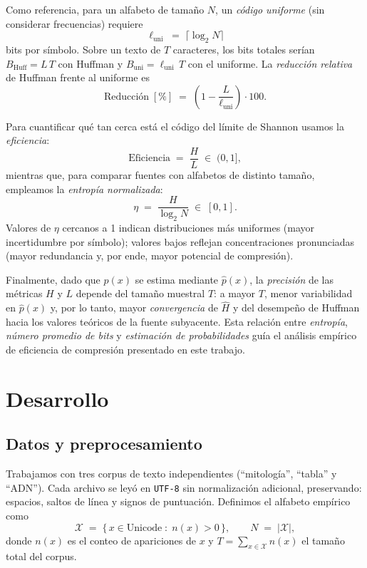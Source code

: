 \documentclass[12pt, a4paper]{article}
\begin{document}
Como referencia, para un alfabeto de tamaño \(N\), un \emph{código uniforme} (sin considerar frecuencias) requiere
\[
\ell_{\text{uni}} \;=\; \big\lceil \log_2 N \big\rceil
\]
bits por símbolo. Sobre un texto de \(T\) caracteres, los bits totales serían \(B_{\text{Huff}}=L\,T\) con Huffman y \(B_{\text{uni}}=\ell_{\text{uni}}\,T\) con el uniforme. La \emph{reducción relativa} de Huffman frente al uniforme es
\[
\text{Reducción}\;[\%] \;=\; \left(1-\frac{L}{\ell_{\text{uni}}}\right)\cdot 100.
\]

Para cuantificar qué tan cerca está el código del límite de Shannon usamos la \emph{eficiencia}:
\[
\text{Eficiencia} \;=\; \frac{H}{L} \;\in\; (0,1],
\]
mientras que, para comparar fuentes con alfabetos de distinto tamaño, empleamos la \emph{entropía normalizada}:
\[
\eta \;=\; \frac{H}{\log_2 N} \;\in\; [0,1].
\]
Valores de \(\eta\) cercanos a 1 indican distribuciones más uniformes (mayor incertidumbre por símbolo); valores bajos reflejan concentraciones pronunciadas (mayor redundancia y, por ende, mayor potencial de compresión).

Finalmente, dado que \(p(x)\) se estima mediante \(\hat p(x)\), la \emph{precisión} de las métricas \(H\) y \(L\) depende del tamaño muestral \(T\): a mayor \(T\), menor variabilidad en \(\hat p(x)\) y, por lo tanto, mayor \emph{convergencia} de \(\hat H\) y del desempeño de Huffman hacia los valores teóricos de la fuente subyacente. Esta relación entre \emph{entropía}, \emph{número promedio de bits} y \emph{estimación de probabilidades} guía el análisis empírico de eficiencia de compresión presentado en este trabajo.

\section*{Desarrollo}

\subsection*{Datos y preprocesamiento}
Trabajamos con tres corpus de texto independientes (``mitología'', ``tabla'' y ``ADN''). Cada archivo se leyó en \texttt{UTF-8} sin normalización adicional, preservando: espacios, saltos de línea y signos de puntuación. 
Definimos el alfabeto empírico como
\[
\mathcal{X} \;=\; \{\, x \in \text{Unicode} \;:\; n(x) > 0 \,\},
\qquad N \;=\; |\mathcal{X}|,
\]
donde $n(x)$ es el conteo de apariciones de $x$ y $T=\sum_{x\in\mathcal{X}} n(x)$ el tamaño total del corpus.
\end{document}
